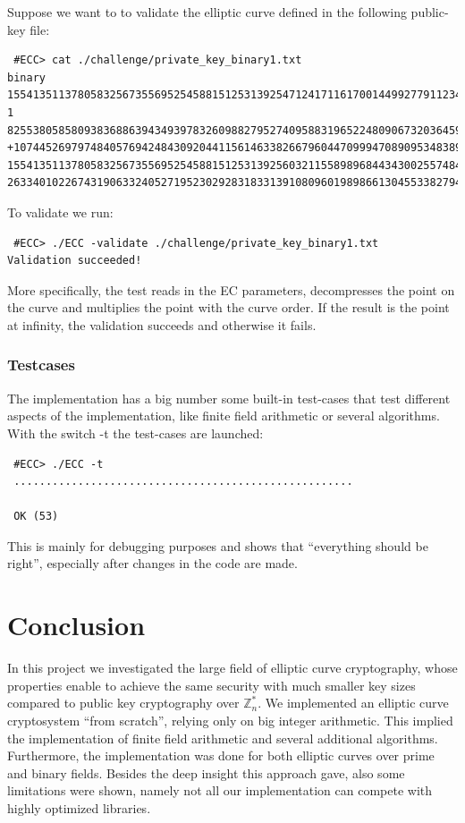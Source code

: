 \documentclass[11pt,english]{article}
\begin{document}
Suppose we want to to validate the elliptic curve defined in the following public-key file:

\begin{verbatim}
 #ECC> cat ./challenge/private_key_binary1.txt
binary
15541351137805832567355695254588151253139254712417116170014499277911234281641667989665
1
8255380585809383688639434939783260988279527409588319652248090673203645932948626009724
+10744526979748405769424843092044115614633826679604470999470890953483892379364112110203
15541351137805832567355695254588151253139256032115589896844343002557484362928298853438
26334010226743190633240527195230292831833139108096019898661304553382794977231705
\end{verbatim}

To validate we run:

\begin{verbatim}
 #ECC> ./ECC -validate ./challenge/private_key_binary1.txt
Validation succeeded!
\end{verbatim}

More specifically, the test reads in the EC parameters, decompresses the point on the curve and multiplies the point with the curve order. If the result is the point at infinity, the validation succeeds and otherwise it fails.

\subsubsection{Testcases}
The implementation has a big number some built-in test-cases that test different aspects of the implementation, like finite field arithmetic or several algorithms. With the switch -t the test-cases are launched:
\begin{verbatim}
 #ECC> ./ECC -t
 .....................................................

 OK (53)
\end{verbatim}
This is mainly for debugging purposes and shows that ``everything should be right'', especially after changes in the code are made.

\section{Conclusion}
In this project we investigated the large field of elliptic curve cryptography, whose properties enable to achieve the same security with much smaller key sizes compared to public key cryptography over $\mathbb{Z}_n^*$. We implemented an elliptic curve cryptosystem ``from scratch'', relying only on big integer arithmetic. This implied the implementation of finite field arithmetic and several additional algorithms. Furthermore, the implementation was done for both elliptic curves over prime and binary fields. Besides the deep insight this approach gave, also some limitations were shown, namely not all our implementation can compete with highly optimized libraries.
\end{document}
